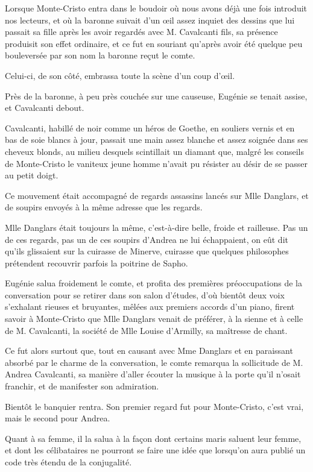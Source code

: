 Lorsque Monte-Cristo entra dans le boudoir où nous avons déjà une fois introduit nos lecteurs, et où la baronne suivait d'un œil assez inquiet des dessins que lui passait sa fille après les avoir regardés avec M. Cavalcanti fils, sa présence produisit son effet ordinaire, et ce fut en souriant qu'après avoir été quelque peu bouleversée par son nom la baronne reçut le comte. 

Celui-ci, de son côté, embrassa toute la scène d'un coup d'œil. 

Près de la baronne, à peu près couchée sur une causeuse, Eugénie se tenait assise, et Cavalcanti debout. 

Cavalcanti, habillé de noir comme un héros de Goethe, en souliers vernis et en bas de soie blancs à jour, passait une main assez blanche et assez soignée dans ses cheveux blonds, au milieu desquels scintillait un diamant que, malgré les conseils de Monte-Cristo le vaniteux jeune homme n'avait pu résister au désir de se passer au petit doigt. 

Ce mouvement était accompagné de regards assassins lancés sur Mlle Danglars, et de soupirs envoyés à la même adresse que les regards. 

Mlle Danglars était toujours la même, c'est-à-dire belle, froide et railleuse. Pas un de ces regards, pas un de ces soupirs d'Andrea ne lui échappaient, on eût dit qu'ils glissaient sur la cuirasse de Minerve, cuirasse que quelques philosophes prétendent recouvrir parfois la poitrine de Sapho. 

Eugénie salua froidement le comte, et profita des premières préoccupations de la conversation pour se retirer dans son salon d'études, d'où bientôt deux voix s'exhalant rieuses et bruyantes, mêlées aux premiers accords d'un piano, firent savoir à Monte-Cristo que Mlle Danglars venait de préférer, à la sienne et à celle de M. Cavalcanti, la société de Mlle Louise d'Armilly, sa maîtresse de chant. 

Ce fut alors surtout que, tout en causant avec Mme Danglars et en paraissant absorbé par le charme de la conversation, le comte remarqua la sollicitude de M. Andrea Cavalcanti, sa manière d'aller écouter la musique à la porte qu'il n'osait franchir, et de manifester son admiration. 

Bientôt le banquier rentra. Son premier regard fut pour Monte-Cristo, c'est vrai, mais le second pour Andrea. 

Quant à sa femme, il la salua à la façon dont certains maris saluent leur femme, et dont les célibataires ne pourront se faire une idée que lorsqu'on aura publié un code très étendu de la conjugalité. 

